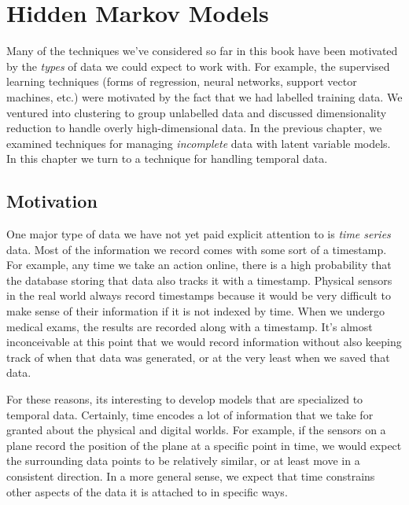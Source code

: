 \chapter{Hidden Markov Models}
Many of the techniques we've considered so far in this book have been motivated by the \textit{types} of data we could expect to work with. For example, the supervised learning techniques (forms of regression, neural networks, support vector machines, etc.) were motivated by the fact that we had labelled training data. We ventured into clustering to group unlabelled data and discussed dimensionality reduction to handle overly high-dimensional data. In the previous chapter, we examined techniques for managing \textit{incomplete} data with latent variable models. In this chapter we turn to a technique for handling
temporal data.

\section{Motivation}

One major type of data we have not yet paid explicit attention to is \textit{time series} data. Most of the information we record comes with some sort of a timestamp. For example, any time we take an action online, there is a high probability that the database storing that data also tracks it with a timestamp. Physical sensors in the real world always record timestamps because it would be very difficult to make sense of their information if it is not indexed by time. When we undergo medical exams, the results are recorded along with a timestamp. It's almost inconceivable at this point that we would record information without also keeping track of when that data was generated, or at the very least when we saved that data.

For these reasons, its interesting to develop models that are specialized to temporal data.
%
Certainly, 
time encodes a lot of information that we take for granted about the physical and digital worlds. For example, if the sensors on a plane record the position of the plane at a specific point in time, we would expect the surrounding data points to be relatively similar, or at least move in a consistent direction. In a more general sense, we expect that time constrains other aspects of the data it is attached to in specific ways.

